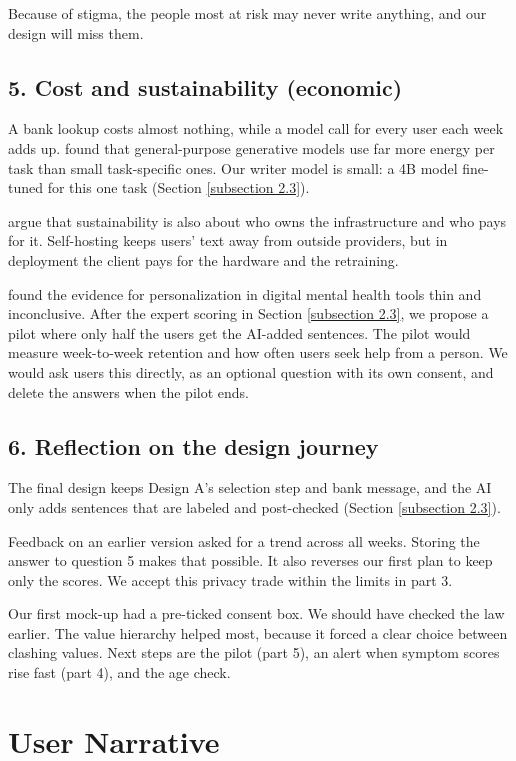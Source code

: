 \documentclass[a4paper]{article}
\begin{document}
Because of stigma, the people most at risk may never write anything, and our design will miss them.

\subsection*{5. Cost and sustainability (economic)}
A bank lookup costs almost nothing, while a model call for every user each week adds up. \citet{luccioni2024power} found that general-purpose generative models use far more energy per task than small task-specific ones. Our writer model is small: a 4B model fine-tuned for this one task (Section \ref{subsection 2.3}).

\citet{hasselbalch2025sustainability} argue that sustainability is also about who owns the infrastructure and who pays for it. Self-hosting keeps users' text away from outside providers, but in deployment the client pays for the hardware and the retraining.

\citet{hornstein2023personalization} found the evidence for personalization in digital mental health tools thin and inconclusive. After the expert scoring in Section \ref{subsection 2.3}, we propose a pilot where only half the users get the AI-added sentences. The pilot would measure week-to-week retention and how often users seek help from a person. We would ask users this directly, as an optional question with its own consent, and delete the answers when the pilot ends.

\subsection*{6. Reflection on the design journey}
The final design keeps Design A's selection step and bank message, and the AI only adds sentences that are labeled and post-checked (Section \ref{subsection 2.3}).

Feedback on an earlier version asked for a trend across all weeks. Storing the answer to question 5 makes that possible. It also reverses our first plan to keep only the scores. We accept this privacy trade within the limits in part 3.

Our first mock-up had a pre-ticked consent box. We should have checked the law earlier. The value hierarchy helped most, because it forced a clear choice between clashing values. Next steps are the pilot (part 5), an alert when symptom scores rise fast (part 4), and the age check.

\newpage

\section{User Narrative}\label{sec:narrative}
\end{document}
